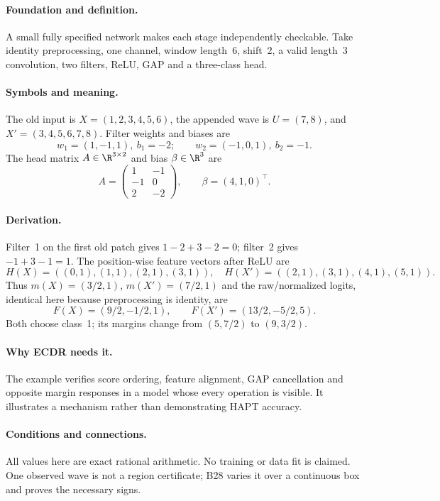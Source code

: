 \paragraph{Foundation and definition.}
A small fully specified network makes each stage independently checkable.
Take identity preprocessing, one channel, window length~6, shift~2, a
valid length~3 convolution, two filters, ReLU, GAP and a three-class head.
\paragraph{Symbols and meaning.}
The old input is $X=(1,2,3,4,5,6)$, the appended wave is $U=(7,8)$,
and $X'=(3,4,5,6,7,8)$. Filter weights and biases are
\[
 w_1=(1,-1,1),\ b_1=-2;\qquad w_2=(-1,0,1),\ b_2=-1.
\]
The head matrix $A\in\R^{3\times2}$ and bias $\beta\in\R^3$ are
\[
 A=\begin{pmatrix}1&-1\\-1&0\\2&-2\end{pmatrix},\qquad
 \beta=(4,1,0)^\top.
\]
\paragraph{Derivation.}
Filter~1 on the first old patch gives $1-2+3-2=0$; filter~2 gives
$-1+3-1=1$. The position-wise feature vectors after ReLU are
\[
 H(X)=((0,1),(1,1),(2,1),(3,1)),\quad
 H(X')=((2,1),(3,1),(4,1),(5,1)).
\]
Thus $m(X)=(3/2,1)$, $m(X')=(7/2,1)$ and the raw/normalized logits,
identical here because preprocessing is identity, are
\[
 F(X)=(9/2,-1/2,1),\qquad F(X')=(13/2,-5/2,5).
\]
Both choose class~1; its margins change from $(5,7/2)$ to $(9,3/2)$.
\paragraph{Why ECDR needs it.}
The example verifies score ordering, feature alignment, GAP cancellation
and opposite margin responses in a model whose every operation is visible.
It illustrates a mechanism rather than demonstrating HAPT accuracy.
\paragraph{Conditions and connections.}
All values here are exact rational arithmetic. No training or data fit is
claimed. One observed wave is not a region certificate; B28 varies it over
a continuous box and proves the necessary signs.

